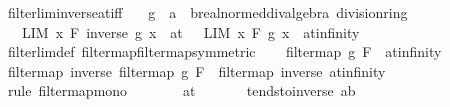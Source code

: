 \begin{isabellebody}
\isamarkupfalse%
%
\endisatagproof
{\isafoldproof}%
%
\isadelimproof
\isanewline
%
\endisadelimproof
\isanewline
{}\isamarkupfalse%
\ filterlim{\isacharunderscore}{\kern0pt}inverse{\isacharunderscore}{\kern0pt}at{\isacharunderscore}{\kern0pt}iff{\isacharcolon}{\kern0pt}\isanewline
\ \ \ g\ {\isacharcolon}{\kern0pt}{\isacharcolon}{\kern0pt}\ {\isachardoublequoteopen}{\isacharprime}{\kern0pt}a\ {\isasymRightarrow}\ {\isacharprime}{\kern0pt}b{\isacharcolon}{\kern0pt}{\isacharcolon}{\kern0pt}{\isacharbraceleft}{\kern0pt}real{\isacharunderscore}{\kern0pt}normed{\isacharunderscore}{\kern0pt}div{\isacharunderscore}{\kern0pt}algebra{\isacharcomma}{\kern0pt}\ division{\isacharunderscore}{\kern0pt}ring{\isacharbraceright}{\kern0pt}{\isachardoublequoteclose}\isanewline
\ \ \ {\isachardoublequoteopen}{\isacharparenleft}{\kern0pt}LIM\ x\ F{\isachardot}{\kern0pt}\ inverse\ {\isacharparenleft}{\kern0pt}g\ x{\isacharparenright}{\kern0pt}\ {\isacharcolon}{\kern0pt}{\isachargreater}{\kern0pt}\ at\ {}{\isacharparenright}{\kern0pt}\ {\isasymlongleftrightarrow}\ {\isacharparenleft}{\kern0pt}LIM\ x\ F{\isachardot}{\kern0pt}\ g\ x\ {\isacharcolon}{\kern0pt}{\isachargreater}{\kern0pt}\ at{\isacharunderscore}{\kern0pt}infinity{\isacharparenright}{\kern0pt}{\isachardoublequoteclose}\isanewline
%
\isadelimproof
\ \ %
\endisadelimproof
%
\isatagproof
{}\isamarkupfalse%
\ filterlim{\isacharunderscore}{\kern0pt}def\ filtermap{\isacharunderscore}{\kern0pt}filtermap{\isacharbrackleft}{\kern0pt}symmetric{\isacharbrackright}{\kern0pt}\isanewline
{}\isamarkupfalse%
\isanewline
\ \ \isamarkupfalse%
\ {\isachardoublequoteopen}filtermap\ g\ F\ {\isasymle}\ at{\isacharunderscore}{\kern0pt}infinity{\isachardoublequoteclose}\isanewline
\ \ \isamarkupfalse%
\ \isamarkupfalse%
\ {\isachardoublequoteopen}filtermap\ inverse\ {\isacharparenleft}{\kern0pt}filtermap\ g\ F{\isacharparenright}{\kern0pt}\ {\isasymle}\ filtermap\ inverse\ at{\isacharunderscore}{\kern0pt}infinity{\isachardoublequoteclose}\isanewline
\ \ \ \ \isamarkupfalse%
\ {\isacharparenleft}{\kern0pt}rule\ filtermap{\isacharunderscore}{\kern0pt}mono{\isacharparenright}{\kern0pt}\isanewline
\ \ \isamarkupfalse%
\ \isamarkupfalse%
\ {\isachardoublequoteopen}{\isasymdots}\ {\isasymle}\ at\ {}{\isachardoublequoteclose}\isanewline
\ \ \ \ \isamarkupfalse%
\ tendsto{\isacharunderscore}{\kern0pt}inverse{\isacharunderscore}{\kern0pt}{}{\isacharbrackleft}{\kern0pt}\ {\isacharprime}{\kern0pt}a{\isacharequal}{\kern0pt}{\isacharprime}{\kern0pt}b{\isacharbrackright}{\kern0pt}\isanewline

\end{isabellebody}
